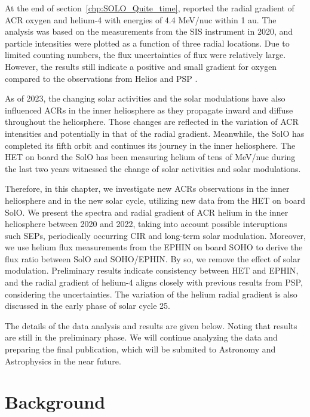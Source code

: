 At the end of section~\ref{chp:SOLO_Quite_time}, \citet{Mason-2021-SolOQuietTime} reported the radial gradient of \ac{ACR} oxygen and helium-4 with energies of 4.4 MeV/nuc within 1 au. The analysis was based on the measurements from the \ac{SIS} instrument in 2020, and particle intensities were plotted as a function of three radial locations. Due to limited counting numbers, the flux uncertainties of flux were relatively large. However, the results still indicate a positive and small gradient for oxygen compared to the observations from Helios and \ac{PSP} \citep{Rankin2021ApJ,Marquardt2018AA}.

As of 2023, the changing solar activities and the solar modulations have also influenced \acp{ACR} in the inner heliosphere as they propagate inward and diffuse throughout the heliosphere. Those changes are reflected in the variation of \ac{ACR} intensities and potentially in that of the radial gradient.
Meanwhile, the \ac{SolO} has completed its fifth orbit and continues its journey in the inner heliosphere. The \ac{HET} on board the \ac{SolO} has been measuring helium of tens of MeV/nuc during the last two years witnessed the change of solar activities and solar modulations.

Therefore, in this chapter, we investigate new \acp{ACR} observations in the inner heliosphere and in the new solar cycle, utilizing new data from the \ac{HET} on board \ac{SolO}. We present the spectra and radial gradient of \ac{ACR} helium in the inner heliosphere between 2020 and 2022, taking into account possible interuptions such \acp{SEP}, periodically occurring \ac{CIR} and long-term solar modulation. Moreover, we use helium flux measurements from the \ac{EPHIN} on board \ac{SOHO} to derive the flux ratio between \ac{SolO} and \ac{SOHO}/\ac{EPHIN}. By so, we remove the effect of solar modulation. Preliminary results indicate consistency between \ac{HET} and \ac{EPHIN}, and the radial gradient of helium-4 aligns closely with previous results from \ac{PSP}, considering the uncertainties. The variation of the helium radial gradient is also discussed in the early phase of solar cycle 25.

The details of the data analysis and results are given below. Noting that results are still in the preliminary phase. We will continue analyzing the data and preparing the final publication, which will be submited to Astronomy and Astrophysics in the near future.


\section{Background}

